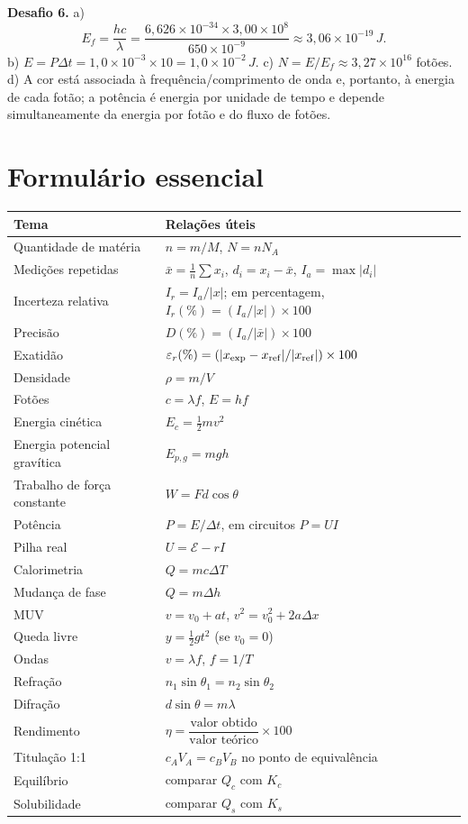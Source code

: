 \documentclass[11pt,a4paper,openany]{book}
\begin{document}
\medskip
\textbf{Desafio 6.} a)
\[
E_f=\frac{hc}{\lambda}=\frac{6,626\times10^{-34}\times3,00\times10^8}{650\times10^{-9}}
\approx3,06\times10^{-19}\,\si{J}.
\]
b) $E=P\Delta t=1,0\times10^{-3}\times10=1,0\times10^{-2}\,\si{J}$. c) $N=E/E_f\approx3,27\times10^{16}$ fotões. d) A cor está associada à frequência/comprimento de onda e, portanto, à energia de cada fotão; a potência é energia por unidade de tempo e depende simultaneamente da energia por fotão e do fluxo de fotões.

\backmatter
\chapter{Formulário essencial}

\begin{longtable}{@{}p{}p{}@{}}
\toprule
\textbf{Tema} & \textbf{Relações úteis} \\
\midrule
Quantidade de matéria & $n=m/M$, $N=nN_A$ \\
Medições repetidas & $\bar{x}=\frac{1}{n}\sum x_i$, $d_i=x_i-\bar{x}$, $I_a=\max|d_i|$ \\
Incerteza relativa & $I_r=I_a/|x|$; em percentagem, $I_r(\%)=(I_a/|x|)\times100$ \\
Precisão & $D(\%)=(I_a/|\bar{x}|)\times100$ \\
Exatidão & $\varepsilon_r(\%)=(|x_{\rm exp}-x_{\rm ref}|/|x_{\rm ref}|)\times100$ \\
Densidade & $\rho=m/V$ \\
Fotões & $c=\lambda f$, $E=hf$ \\
Energia cinética & $E_c=\tfrac12mv^2$ \\
Energia potencial gravítica & $E_{p,g}=mgh$ \\
Trabalho de força constante & $W=Fd\cos\theta$ \\
Potência & $P=E/\Delta t$, em circuitos $P=UI$ \\
Pilha real & $U=\mathcal E-rI$ \\
Calorimetria & $Q=mc\Delta T$ \\
Mudança de fase & $Q=m\Delta h$ \\
MUV & $v=v_0+at$, $v^2=v_0^2+2a\Delta x$ \\
Queda livre & $y=\tfrac12gt^2$ (se $v_0=0$) \\
Ondas & $v=\lambda f$, $f=1/T$ \\
Refração & $n_1\sin\theta_1=n_2\sin\theta_2$ \\
Difração & $d\sin\theta=m\lambda$ \\
Rendimento & $\eta=\dfrac{\text{valor obtido}}{\text{valor teórico}}\times100$ \\
Titulação 1:1 & $c_A V_A=c_B V_B$ no ponto de equivalência \\
Equilíbrio & comparar $Q_c$ com $K_c$ \\
Solubilidade & comparar $Q_s$ com $K_s$ \\
\bottomrule
\end{longtable}
\end{document}

